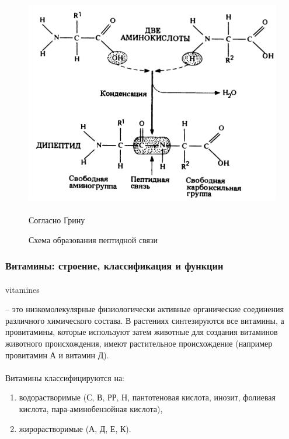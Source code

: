 \begin{figure}[h!]
  \centering
       \includegraphics[width=0.5\linewidth]{pictures/dipeptid}
\caption{Схема образования пептидной связи}
\paragraph*{}Согласно Грину \cite{green_bio}
\label{dipeptid}
\end{figure}



\subsubsection*{Витамины: строение, классификация и функции}

\paragraph*{}\hypertarget{vitamines}{\gls{vitamines}} -- это низкомолекулярные физиологически активные органические соединения различного химического состава. В растениях синтезируются все витамины, а провитамины, которые используют затем животные для создания витаминов животного происхождения, имеют растительное происхождение (например провитамин А и витамин Д).

\paragraph*{}Витамины классифицируются на:

\begin{enumerate}

	\item водорастворимые (С, В, РР, Н, пантотеновая кислота, инозит, фолиевая кислота, пара-аминобензойная кислота),
	\item жирорастворимые (А, Д, Е, К).

\end{enumerate}

